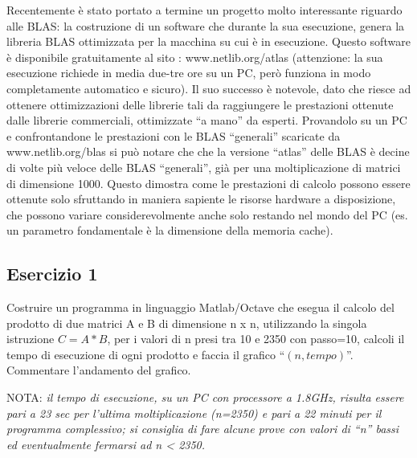 Recentemente è stato portato a termine un progetto molto interessante riguardo alle BLAS: la costruzione di un software che durante la sua esecuzione, genera la libreria BLAS ottimizzata per la macchina su cui è in esecuzione.
Questo software è disponibile gratuitamente al sito :   www.netlib.org/atlas    (attenzione: la sua esecuzione richiede in media due-tre ore su un PC, però funziona in modo completamente automatico e sicuro).
Il suo successo è notevole, dato che riesce ad ottenere ottimizzazioni delle librerie tali da raggiungere le prestazioni ottenute dalle librerie commerciali, ottimizzate ``a mano'' da esperti.
Provandolo su un PC e confrontandone le prestazioni con le BLAS ``generali'' scaricate da www.netlib.org/blas si può notare che che la versione ``atlas'' delle BLAS è decine di volte più veloce delle BLAS ``generali'', già per una moltiplicazione di matrici di dimensione 1000.
Questo dimostra come le prestazioni di calcolo possono essere ottenute solo sfruttando in maniera sapiente le risorse hardware a disposizione, che possono variare considerevolmente anche solo restando nel mondo del PC (es. un parametro fondamentale è la dimensione della memoria cache).

\subsection{Esercizio 1}

 Costruire un programma in linguaggio Matlab/Octave che esegua il calcolo del prodotto di due  matrici A e B di dimensione n x n, utilizzando la singola istruzione $C = A*B$, per i valori di n presi tra 10 e 2350 con passo=10,  calcoli il tempo di esecuzione di ogni prodotto e faccia il grafico ``$(n, tempo)$''. Commentare l'andamento del grafico.

NOTA: \textit{il tempo di esecuzione, su un PC con processore a 1.8GHz, risulta essere pari a 23 sec per l'ultima moltiplicazione (n=2350) e pari a 22 minuti per il programma complessivo; si consiglia di fare alcune prove con valori di ``n'' bassi ed eventualmente fermarsi ad n < 2350.}



